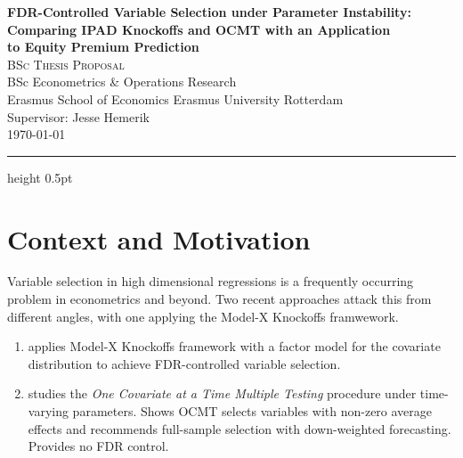 \documentclass[12pt, a4paper]{article}
\begin{document}

\thispagestyle{empty}

\vspace*{0.5cm}

\begin{center}
    {\Large\bfseries FDR-Controlled Variable Selection under Parameter Instability:\\[0.4em]
    Comparing IPAD Knockoffs and OCMT with an Application\\[0.2em]
    to Equity Premium Prediction}\\[2em]
    {\normalsize\textsc{BSc Thesis Proposal}}\\[0.8em]
    {\normalsize BSc Econometrics \& Operations Research}\\
    {\normalsize Erasmus School of Economics\,\textbar\,Erasmus University Rotterdam}\\[1em]
    {\normalsize Supervisor: Jesse Hemerik}\\[0.8em]
    {\color{darkgray}\small\today}
\end{center}

\vspace{1em}
\hrule height 0.5pt
\vspace{2em}

\section{Context and Motivation}

Variable selection in high dimensional regressions is a frequently occurring problem in econometrics and beyond. Two recent approaches attack this from different angles, with one applying the \citet{candes2018} Model-X Knockoffs framwework.
\begin{enumerate}[leftmargin=*, itemsep=4pt]
    \item \citet{fan2020ipad} applies Model-X Knockoffs framework with a factor model for the covariate
distribution to achieve FDR-controlled variable selection.
    \item \citet{chudik2024ocmt} studies the \textit{One Covariate at a
Time Multiple Testing} procedure under time-varying parameters. Shows OCMT selects
variables with non-zero average effects and recommends full-sample selection with
down-weighted forecasting. Provides no FDR control.
\end{enumerate}
\end{document}
